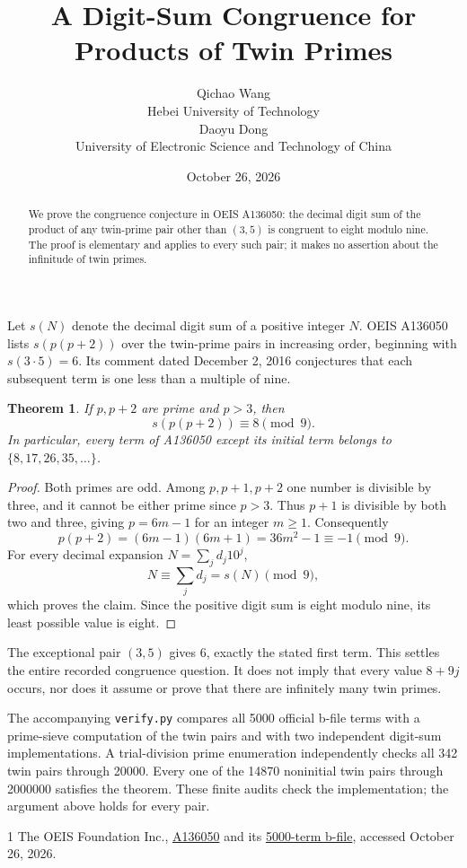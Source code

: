 \documentclass[10pt]{article}
\title{A Digit-Sum Congruence for Products of Twin Primes}
\author{Qichao Wang\\{\small Hebei University of Technology}\\[0.3em]
Daoyu Dong\\{\small University of Electronic Science and Technology of China}}
\date{October 26, 2026}
\newtheorem{theorem}{Theorem}
\begin{document}
\maketitle
\begin{abstract}
We prove the congruence conjecture in OEIS A136050: the decimal digit
sum of the product of any twin-prime pair other than $(3,5)$ is
congruent to eight modulo nine. The proof is elementary and applies
to every such pair; it makes no assertion about the infinitude of
twin primes.
\end{abstract}

Let $s(N)$ denote the decimal digit sum of a positive integer $N$.
OEIS A136050 lists $s(p(p+2))$ over the twin-prime pairs in increasing
order, beginning with $s(3\cdot5)=6$. Its comment dated December 2,
2016 conjectures that each subsequent term is one less than a
multiple of nine.

\begin{theorem}
If $p,p+2$ are prime and $p>3$, then
\[
 s(p(p+2))\equiv8\pmod9.
\]
In particular, every term of A136050 except its initial term belongs
to $\{8,17,26,35,\ldots\}$.
\end{theorem}
\begin{proof}
Both primes are odd. Among $p,p+1,p+2$ one number is divisible by
three, and it cannot be either prime since $p>3$. Thus $p+1$ is
divisible by both two and three, giving $p=6m-1$ for an integer
$m\ge1$. Consequently
\[
 p(p+2)=(6m-1)(6m+1)=36m^2-1\equiv-1\pmod9.
\]
For every decimal expansion $N=\sum_j d_j10^j$,
\[
 N\equiv\sum_j d_j=s(N)\pmod9,
\]
which proves the claim. Since the positive digit sum is eight modulo
nine, its least possible value is eight.
\end{proof}

The exceptional pair $(3,5)$ gives $6$, exactly the stated first
term. This settles the entire recorded congruence question. It does
not imply that every value $8+9j$ occurs, nor does it assume or prove
that there are infinitely many twin primes.

The accompanying \texttt{verify.py} compares all 5000 official
b-file terms with a prime-sieve computation of the twin pairs and
with two independent digit-sum implementations. A trial-division
prime enumeration independently checks all 342 twin pairs through
20000. Every one of the 14870 noninitial twin pairs through
2000000 satisfies the theorem. These finite audits check the
implementation; the argument above holds for every pair.

\begin{thebibliography}{1}
 The OEIS Foundation Inc.,
\href{https://oeis.org/A136050}{A136050} and its
\href{https://oeis.org/A136050/b136050.txt}{5000-term b-file},
accessed October 26, 2026.
\end{thebibliography}
\end{document}
